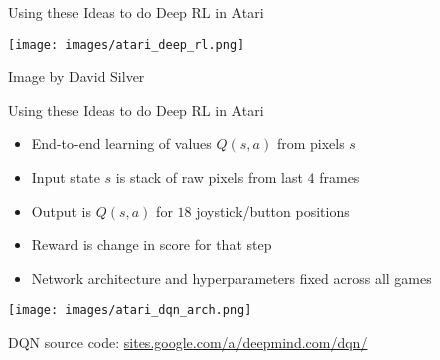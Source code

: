 \documentclass[aspectratio=169]{../latex_main/tntbeamer}  %
\begin{document}
\begin{frame}[c]{Using these Ideas to do Deep RL in Atari}
	
\centering
\texttt{[image: images/atari\_deep\_rl.png]}

\begin{flushright}
	\small
	Image by David Silver
\end{flushright}
	
\end{frame}
\begin{frame}[c]{Using these Ideas to do Deep RL in Atari}
	
\begin{itemize}
	\item End-to-end learning of values $Q(s, a)$ from pixels $s$
	\item Input state $s$ is stack of raw pixels from last $4$ frames
	\item Output is $Q(s, a)$ for $18$ joystick/button positions
	\item Reward is change in score for that step
	\item Network architecture and hyperparameters fixed across all games
\end{itemize}

\centering
\texttt{[image: images/atari\_dqn\_arch.png]}

\begin{flushright}
	\footnotesize
	\vspace{-0.1cm}
	DQN source code: \url{sites.google.com/a/deepmind.com/dqn/}
\end{flushright}
	
\end{frame}
\end{document}
